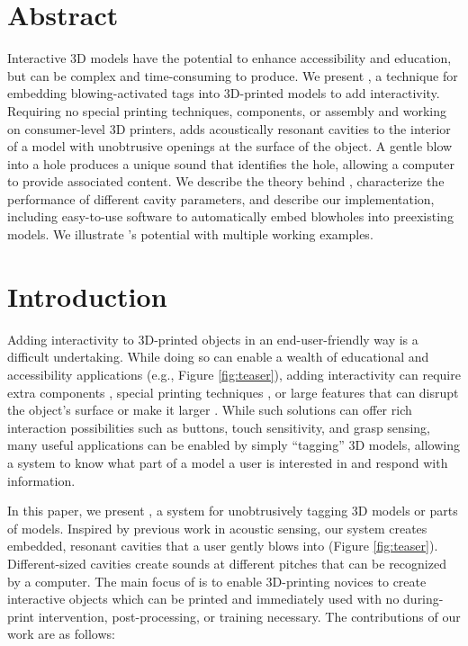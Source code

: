   \section{Abstract}
    Interactive 3D models have the potential to enhance accessibility and
    education, but can be complex and time-consuming to produce. We present
    \textit{\bh}, a technique for embedding blowing-activated tags into
    3D-printed models to add interactivity. Requiring no special printing
    techniques, components, or assembly and working on consumer-level 3D
    printers, \bh adds acoustically resonant cavities to the interior of a model
    with unobtrusive openings at the surface of the object. A gentle blow into a
    hole produces a unique sound that identifies the hole, allowing a computer
    to provide associated content. We describe the theory behind \bh,
    characterize the performance of different cavity parameters, and describe
    our implementation, including easy-to-use software to automatically embed
    blowholes into preexisting models. We illustrate \bh's potential with
    multiple working examples. 
  
  \section{Introduction}
    Adding interactivity to 3D-printed objects in an end-user-friendly way is a
    difficult undertaking. While doing so can enable a wealth of educational and
    accessibility applications (e.g., Figure \ref{fig:teaser}), adding
    interactivity can require extra components \cite{Savage:2013, Nappey:2014},
    special printing techniques \cite{Schmitz:2015, Bacher:2016, Peng:2015}, or
    large features that can disrupt the object's surface \cite{Harrison:2012kw,
    Ou:2016a, Savage:2015, Shi:2016} or make it larger \cite{Li:2016}. While
    such solutions can offer rich interaction possibilities such as buttons,
    touch sensitivity, and grasp sensing, many useful applications can be
    enabled by simply ``tagging'' 3D models, allowing a system to know what part
    of a model a user is interested in and respond with information.
    
    In this paper, we present \textit{\bh}, a system for unobtrusively tagging
    3D models or parts of models. Inspired by previous work in acoustic sensing,
    our system creates embedded, resonant cavities that a user gently blows into
    (Figure \ref{fig:teaser}). Different-sized cavities create sounds at
    different pitches that can be recognized by a computer. The main focus of
    \bh is to enable 3D-printing novices to create interactive objects which can
    be printed and immediately used with no during-print intervention,
    post-processing, or training necessary. The contributions of our work are as
    follows:

